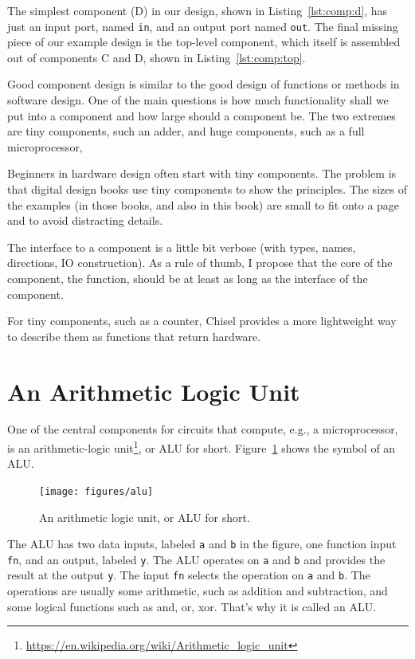 \documentclass[%
    10pt,
    headinclude, footexclude,
    openright, %
    notitlepage,
    cleardoubleempty,
    headsepline,
    pointlessnumbers,
    bibtotoc, idxtotoc,
    ]{scrbook}
\newcommand{\code}[1]{{\small{\texttt{#1}}}}
\newcommand{\myref}[2]{\href{#1}{#2}}
\renewcommand{\myref}[2]{{#2}{\footnote{\url{#1}}}}
\begin{document}

The simplest component (D) in our design, shown in Listing~\ref{lst:comp:d},
has just an input port, named \code{in}, and
an output port named \code{out}.
The final missing piece of our example design is the top-level component, which itself
is assembled out of components C and D, shown in Listing~\ref{lst:comp:top}.


Good component design is similar to the good design of functions or methods in
software design. One of the main questions is how much functionality shall we put into
a component and how large should a component be. The two extremes are tiny
components, such an adder, and huge components, such as a full microprocessor,

Beginners in hardware design often start with tiny components.
The problem is that digital design books use tiny components to show the principles.
The sizes of the examples (in those books, and also in this book) are small
to fit onto a page and to avoid distracting details.

The interface to a component is a little bit verbose (with types, names, directions,
IO construction). As a rule of thumb, I propose that the core of the component,
the function, should be at least as long as the interface of the component.

For tiny components, such as a counter, Chisel provides a more lightweight
way to describe them as functions that return hardware.


\section{An Arithmetic Logic Unit}

One of the central components for circuits that compute, e.g., a microprocessor, is an
\myref{https://en.wikipedia.org/wiki/Arithmetic_logic_unit}{arithmetic-logic unit},
or ALU for short. Figure~\ref{fig:alu} shows the symbol of an ALU.


\begin{figure}
  \centering
  \texttt{[image: figures/alu]}
  \caption{An arithmetic logic unit, or ALU for short.}
  \label{fig:alu}
\end{figure}

The ALU has two data inputs, labeled \code{a} and \code{b} in the figure, one function input \code{fn},
and an output, labeled \code{y}. The ALU operates on \code{a} and \code{b} and provides the result
at the output \code{y}. The input \code{fn} selects the operation on \code{a} and \code{b}.
The operations are usually some arithmetic, such as addition and subtraction, and some logical
functions such as and, or, xor. That's why it is called an ALU.
\end{document}
